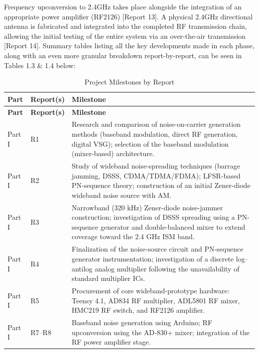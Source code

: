 \documentclass[12pt,a4paper]{report}
\begin{document}
	Frequency upconversion to 2.4GHz takes place alongside the integration of an appropriate power amplifier (RF2126) [Report 13]. A physical 2.4GHz directional antenna is fabricated and integrated into the completed RF transmission chain, allowing the initial testing of the entire system via an over-the-air transmission [Report 14]. Summary tables listing all the key developments made in each phase, along with an even more granular breakdown report-by-report, can be seen in Tables 1.3 \& 1.4 below:
	\begin{longtable}{|p{2cm}|p{2cm}|p{10cm}|}
		\caption{Project Milestones by Report} \label{tab:milestones} \\
		\hline
		\textbf{Part} & \textbf{Report(s)} & \textbf{Milestone} \\
		\hline
		\endfirsthead
		
		\hline
		\textbf{Part} & \textbf{Report(s)} & \textbf{Milestone} \\
		\hline
		\endhead
		
		Part I & R1 &
		Research and comparison of noise-on-carrier generation methods (baseband modulation, direct RF generation, digital VSG); selection of the baseband modulation (mixer-based) architecture. \\
		\hline
		
		Part I & R2 &
		Study of wideband noise-spreading techniques (barrage jamming, DSSS, CDMA/TDMA/FDMA); LFSR-based PN-sequence theory; construction of an initial Zener-diode wideband noise source with AM. \\
		\hline
		
		Part I & R3 &
		Narrowband (320 kHz) Zener-diode noise-jammer construction; investigation of DSSS spreading using a PN-sequence generator and double-balanced mixer to extend coverage toward the 2.4 GHz ISM band. \\
		\hline
		
		Part I & R4 &
		Finalization of the noise-source circuit and PN-sequence generator instrumentation; investigation of a discrete log--antilog analog multiplier following the unavailability of standard multiplier ICs. \\
		\hline
		
		Part I & R5 &
		Procurement of core wideband-prototype hardware: Teensy 4.1, AD834 RF multiplier, ADL5801 RF mixer, HMC219 RF switch, and RF2126 amplifier. \\
		\hline
		
		Part I & R7--R8 &
		Baseband noise generation using Arduino; RF upconversion using the AD-830+ mixer; integration of the RF power amplifier stage. \\
		\hline
		

\end{longtable}
\end{document}
